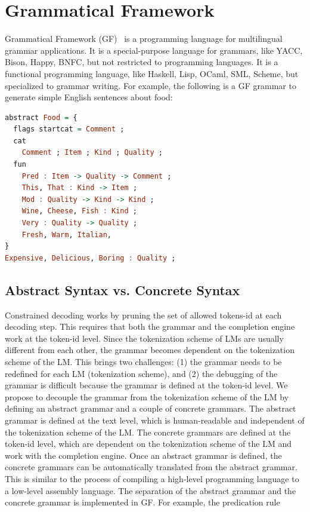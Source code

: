 \section{Grammatical Framework}\label{app_sec:grammatical_framework}

Grammatical Framework (GF)~ is a programming language for multilingual grammar applications.
It is a special-purpose language for grammars, like YACC, Bison, Happy, BNFC, but not restricted to programming languages.
It is a functional programming language, like Haskell, Lisp, OCaml, SML, Scheme, but specialized to grammar writing.
For example, the following is a GF grammar to generate simple English sentences about food:

\begin{lstlisting}[language=haskell,caption={The abstract syntax of the Food grammar.},captionpos=b,label={lst:gf food grammar}, basicstyle=\small\ttfamily]
abstract Food = {
  flags startcat = Comment ;
  cat
    Comment ; Item ; Kind ; Quality ;
  fun
    Pred : Item -> Quality -> Comment ;
    This, That : Kind -> Item ;
    Mod : Quality -> Kind -> Kind ;
    Wine, Cheese, Fish : Kind ;
    Very : Quality -> Quality ;
    Fresh, Warm, Italian,
}
Expensive, Delicious, Boring : Quality ;
\end{lstlisting}


\subsection{Abstract Syntax vs. Concrete Syntax}\label{subsec:abstract-syntax-vs-concrete-syntax}

Constrained decoding works by pruning the set of allowed tokens-id at each decoding step.
This requires that both the grammar and the completion engine work at the token-id level.
Since the tokenization scheme of LMs are usually different from each other, the grammar becomes dependent on the tokenization scheme of the LM.
%
This brings two challenges: (1) the grammar needs to be redefined for each LM (tokenization scheme), and (2) the debugging of the grammar is difficult because the grammar is defined at the token-id level.
%
We propose to decouple the grammar from the tokenization scheme of the LM by defining an abstract grammar and a couple of concrete grammars.
%
The abstract grammar is defined at the text level, which is human-readable and independent of the tokenization scheme of the LM.
%
The concrete grammars are defined at the token-id level, which are dependent on the tokenization scheme of the LM and work with the completion engine.
%
Once an abstract grammar is defined, the concrete grammars can be automatically translated from the abstract grammar.
%
This is similar to the process of compiling a high-level programming language to a low-level assembly language.
%
The separation of the abstract grammar and the concrete grammar is implemented in GF.
%
For example, the predication rule

